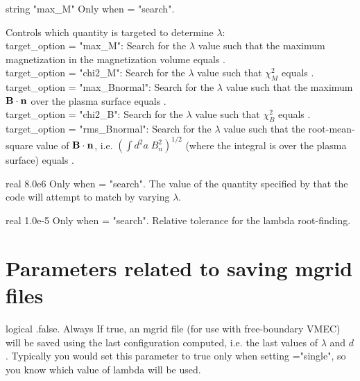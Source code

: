 \myhrule

{string}
{{\ttfamily "max\_M"}}
{Only when  = {\ttfamily "search"}.}
{Controls which quantity is targeted to determine $\lambda$:\\

{\ttfamily target\_option = "max\_M"}: Search for the $\lambda$ value such that the maximum
magnetization in the magnetization volume equals .\\

{\ttfamily target\_option = "chi2\_M"}: Search for the $\lambda$ value such that $\chi^2_M$ equals .\\

{\ttfamily target\_option = "max\_Bnormal"}: Search for the $\lambda$ value such that the maximum
${\mathbf B}\cdot{\mathbf n}$ over the plasma surface equals .\\

{\ttfamily target\_option = "chi2\_B"}: Search for the $\lambda$ value such that $\chi^2_B$ equals .\\

{\ttfamily target\_option = "rms\_Bnormal"}: Search for the $\lambda$ value such that the root-mean-square value of ${\mathbf B}\cdot{\mathbf n}$, i.e.
$\left( \int d^2a\; B_n^2 \right)^{1/2}$ (where the integral is over the plasma surface) equals .

}

\myhrule

{real}
{8.0e6}
{Only when  = {\ttfamily "search"}.}
{The value of the quantity specified by  that the code will attempt to match
by varying $\lambda$.
}

\myhrule

{real}
{1.0e-5}
{Only when  = {\ttfamily "search"}.}
{Relative tolerance for the lambda root-finding.}

\myhrule

\section{Parameters related to saving mgrid files}

{logical}
{{\ttfamily .false.}}
{Always}
{If true, an mgrid file (for use with free-boundary VMEC) will be saved using the last configuration computed, i.e. the last values of $\lambda$ and $d$.
Typically you would set this parameter to true only when setting ={\ttfamily "single"}, so you know which value of lambda will be used.}

